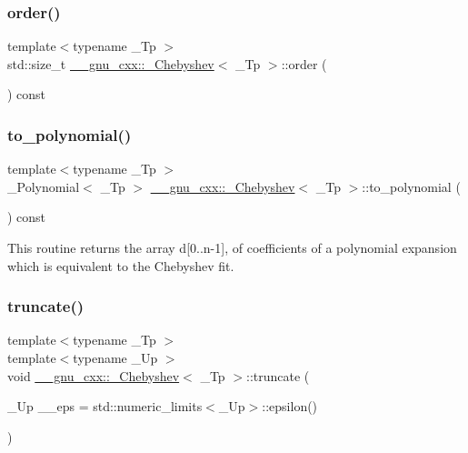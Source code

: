 \subsubsection{\texorpdfstring{order()}{order()}}
{\footnotesize\ttfamily template$<$typename \+\_\+\+Tp $>$ \\
std\+::size\+\_\+t \hyperlink{class____gnu__cxx_1_1__Chebyshev}{\+\_\+\+\_\+gnu\+\_\+cxx\+::\+\_\+\+Chebyshev}$<$ \+\_\+\+Tp $>$\+::order (\begin{DoxyParamCaption}{ }\end{DoxyParamCaption}) const\hspace{0.3cm}{\ttfamily [inline]}}

\mbox{\label{class____gnu__cxx_1_1__Chebyshev_a0039dec54cff971242eb501fd76eec81}} 
\subsubsection{\texorpdfstring{to\+\_\+polynomial()}{to\_polynomial()}}
{\footnotesize\ttfamily template$<$typename \+\_\+\+Tp $>$ \\
\+\_\+\+Polynomial$<$ \+\_\+\+Tp $>$ \hyperlink{class____gnu__cxx_1_1__Chebyshev}{\+\_\+\+\_\+gnu\+\_\+cxx\+::\+\_\+\+Chebyshev}$<$ \+\_\+\+Tp $>$\+::to\+\_\+polynomial (\begin{DoxyParamCaption}{ }\end{DoxyParamCaption}) const}

This routine returns the array d\mbox{[}0..n-\/1\mbox{]}, of coefficients of a polynomial expansion which is equivalent to the Chebyshev fit. \mbox{\label{class____gnu__cxx_1_1__Chebyshev_af50304bc19f6383599c4169720ef0a97}} 
\subsubsection{\texorpdfstring{truncate()}{truncate()}}
{\footnotesize\ttfamily template$<$typename \+\_\+\+Tp $>$ \\
template$<$typename \+\_\+\+Up $>$ \\
void \hyperlink{class____gnu__cxx_1_1__Chebyshev}{\+\_\+\+\_\+gnu\+\_\+cxx\+::\+\_\+\+Chebyshev}$<$ \+\_\+\+Tp $>$\+::truncate (\begin{DoxyParamCaption}\item[{\+\_\+\+Up}]{\+\_\+\+\_\+eps = {\ttfamily std\+:\+:numeric\+\_\+limits$<$\+\_\+Up$>$\+:\+:epsilon()} }\end{DoxyParamCaption})}

